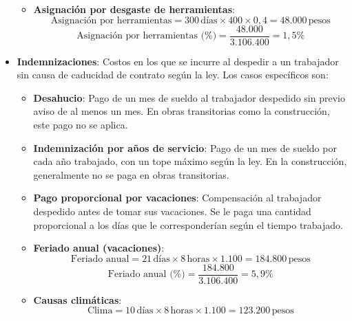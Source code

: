 \begin{itemize}
\begin{itemize}
        \item \textbf{Asignación por desgaste de herramientas}:
        \begin{equation}
        \text{Asignación por herramientas} = 300 \, \text{días} \times 400 \times 0,4 = 48.000 \, \text{pesos}
        \end{equation}
        \begin{equation}
        \text{Asignación por herramientas (\%)} = \frac{48.000}{3.106.400} = 1,5\%
        \end{equation}
    \end{itemize}
    \item \textbf{Indemnizaciones}: Costos en los que se incurre al despedir a un trabajador sin causa de caducidad de contrato según la ley. Los casos específicos son:
    \begin{itemize}
        \item \textbf{Desahucio}: Pago de un mes de sueldo al trabajador despedido sin previo aviso de al menos un mes. En obras transitorias como la construcción, este pago no se aplica.
        
        \item \textbf{Indemnización por años de servicio}: Pago de un mes de sueldo por cada año trabajado, con un tope máximo según la ley. En la construcción, generalmente no se paga en obras transitorias.
        
        \item \textbf{Pago proporcional por vacaciones}: Compensación al trabajador despedido antes de tomar sus vacaciones. Se le paga una cantidad proporcional a los días que le corresponderían según el tiempo trabajado.
    
        \item \textbf{Feriado anual (vacaciones)}:
        \begin{equation}
        \text{Feriado anual} = 21 \, \text{días} \times 8 \, \text{horas} \times 1.100 = 184.800 \, \text{pesos}
        \end{equation}
        \begin{equation}
        \text{Feriado anual (\%)} = \frac{184.800}{3.106.400} = 5,9\%
        \end{equation}
        
        \item \textbf{Causas climáticas}:
        \begin{equation}
        \text{Clima} = 10 \, \text{días} \times 8 \, \text{horas} \times 1.100 = 123.200 \, \text{pesos}
        \end{equation}
        

\end{itemize}
\end{itemize}
